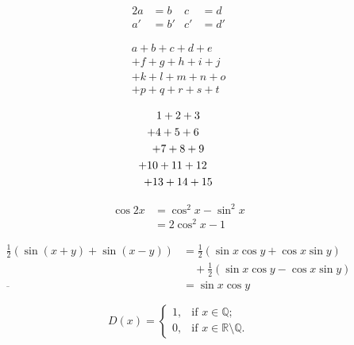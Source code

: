 \documentclass{ctexart}
\begin{document}
\begin{alignat}{2}
a& =b& c& =d\\
a'& =b'& c'& =d'
\end{alignat}

\begin{multline}
  a+b+c+d+e \\
  +f+g+h+i+j\\
  +k+l+m+n+o\\
  +p+q+r+s+t
\end{multline}

    \setlength{\multlinegap}{3em}
    \setlength{\multlinetaggap}{3em}
    \begin{multline*}
    1+2+3 \\ \shoveleft{+4+5+6} \\
    +7+8+9 \\
    \shoveright{+10+11+12} \\ +13+14+15
    \end{multline*}
    
        \begin{equation}  \begin{split}
    \cos 2x &= \cos^2 x - \sin^2 x \\
            &= 2\cos^2 x - 1
    \end{split}  \end{equation}

    \begin{equation}\label{eq:trigonometric}
    \begin{split}
    \frac12 (\sin(x+y) + \sin(x-y))
      &= \frac12(\sin x\cos y + \cos x\sin y) \\
      &\quad + \frac12(\sin x\cos y - \cos x\sin y) \\
 \overline{}     &= \sin x\cos y
    \end{split}
    \end{equation}

\iffalse
\begin{dmath}\label{eq:trigonometric}
\frac12 (\sin(x+y) + \sin(x-y)) = \frac12(\sin x\cos y + \cos x\sin y)
+ \frac12(\sin x\cos y - \cos x\sin y) = \sin x\cos y
\end{dmath}
\fi

    \begin{equation}\label{eq:dirichlet}
    D(x) = \begin{cases}
    1, & \text{if } x \in \mathbb{Q}; \\
    0, & \text{if } x \in
         \mathbb{R}\setminus\mathbb{Q}.
    \end{cases}
    \end{equation}
\end{document}
